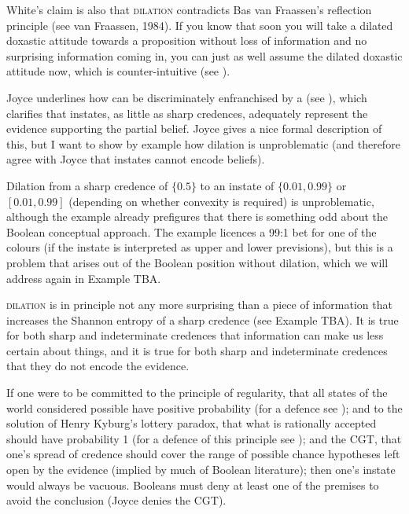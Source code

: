 \documentclass[11pt]{article}
\begin{document}
White's claim is also that \textsc{dilation} contradicts Bas van
Fraassen's reflection principle (see van Fraassen,
1984). If you know that soon you will take
a dilated doxastic attitude towards a proposition without loss of
information and no surprising information coming in, you can just as
well assume the dilated doxastic attitude now, which is
counter-intuitive (see ).

Joyce underlines how  can be discriminately
enfranchised by a  (see
), which clarifies that instates, as little as
sharp credences, adequately represent the evidence supporting the
partial belief. Joyce gives a nice formal description of this, but I
want to show by example how dilation is unproblematic (and therefore
agree with Joyce that instates cannot encode beliefs).


Dilation from a sharp credence of $\{0.5\}$ to an instate of
$\{0.01,0.99\}$ or $[0.01,0.99]$ (depending on whether convexity is
required) is unproblematic, although the example already prefigures
that there is something odd about the Boolean conceptual approach. The
example licences a 99:1 bet for one of the colours (if the instate is
interpreted as upper and lower previsions), but this is a problem that
arises out of the Boolean position without dilation, which we will
address again in Example TBA\tbd{}.

\textsc{dilation} is in principle not any more surprising than a piece
of information that increases the Shannon entropy of a sharp credence
(see Example TBA\tbd{}). It is true for both sharp and indeterminate credences
that information can make us less certain about things, and it is true
for both sharp and indeterminate credences that they do not encode the
evidence.

If one were to be committed to the principle of regularity, that all
states of the world considered possible have positive probability (for
a defence see ); and to the solution of
Henry Kyburg's lottery paradox, that what is rationally accepted
should have probability 1 (for a defence of this principle see
); and the CGT, that one's spread of
credence should cover the range of possible chance hypotheses left
open by the evidence (implied by much of Boolean literature); then
one's instate would always be vacuous. Booleans must deny at least one
of the premises to avoid the conclusion (Joyce denies the CGT).
\end{document}
